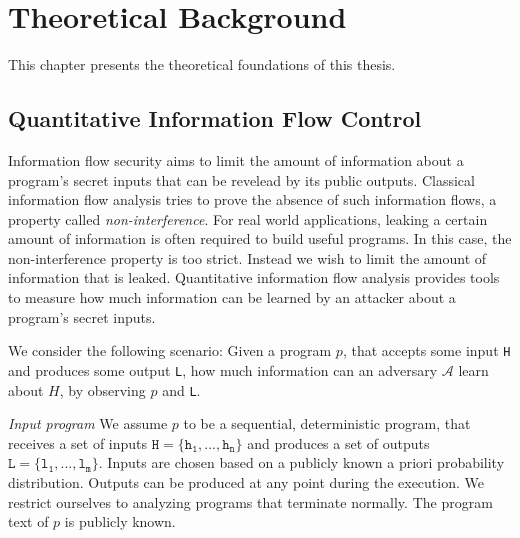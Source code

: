 \chapter{Theoretical Background}\label{sec:basics}

This chapter presents the theoretical foundations of this thesis. 

\section{Quantitative Information Flow Control}


Information flow security aims to limit the amount of information about a program's secret inputs that can be revelead by its public outputs. Classical information flow analysis tries to prove the absence of such information flows, a property called \emph{non-interference}.
For real world applications, leaking a certain amount of information is often required to build useful programs. In this case, the non-interference property is too strict. Instead we wish to limit the amount of information that is leaked.
Quantitative information flow analysis provides tools to measure how much information can be learned by an attacker about a program's secret inputs.


We consider the following scenario: Given a program $p$, that accepts some input \texttt{H} and produces some output \texttt{L}, how much information can an adversary $\mathcal{A}$ learn about $H$, by observing $p$ and \texttt{L}.

\emph{Input program} We assume $p$ to be a sequential, deterministic program, that receives a set of inputs $\mathtt{H = \{h_1, ..., h_n\}}$ and produces a set of outputs $\mathtt{L = \{l_1, ..., l_m\}}$. Inputs are chosen based on a publicly known a priori probability distribution. Outputs can be produced at any point during the execution. 
We restrict ourselves to analyzing programs that terminate normally. The program text of $p$ is publicly known.

